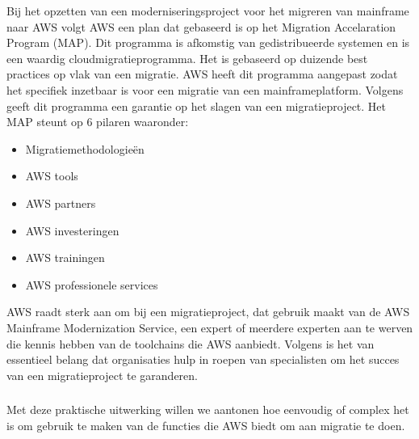 Bij het opzetten van een moderniseringsproject voor het migreren van mainframe naar AWS volgt AWS een plan dat gebaseerd is op het Migration Accelaration Program (MAP). Dit programma is afkomstig van gedistribueerde systemen en is een waardig cloudmigratieprogramma. Het is gebaseerd op duizende best practices op vlak van een migratie. AWS heeft dit programma aangepast zodat het specifiek inzetbaar is voor een migratie van een mainframeplatform. Volgens \textcite{Valence2021} geeft dit programma een garantie op het slagen van een migratieproject. Het MAP steunt op 6 pilaren waaronder:
 \begin{itemize}
    \item Migratiemethodologieën
    \item AWS tools
    \item AWS partners
    \item AWS investeringen
    \item AWS trainingen
    \item AWS professionele services
\end{itemize}

AWS raadt sterk aan om bij een migratieproject, dat gebruik maakt van de AWS Mainframe Modernization Service, een expert of meerdere experten aan te werven die kennis hebben van de toolchains die AWS aanbiedt. Volgens \textcite{Valence2021} is het van essentieel belang dat organisaties hulp in roepen van specialisten om het succes van een migratieproject te garanderen. 

\subsubsection{}
\label{sec: Een praktische uitwerking: uitvoeren  van COBOL applicatie op AWS Lambda}

Met deze praktische uitwerking willen we aantonen hoe eenvoudig of complex het is om gebruik te maken van de functies die AWS biedt om aan migratie te doen.

